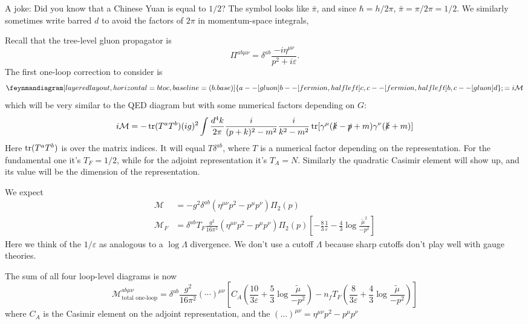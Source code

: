 A joke: Did you know that a Chinese Yuan is equal to $1/2$?
The symbol looks like $\bar \pi$, and since $\hbar = h/2 \pi$, $\bar \pi = \pi/2 \pi = 1/2$.
We similarly sometimes write barred $d$ to avoid the factors of $2 \pi$ in momentum-space integrals, 

Recall that the tree-level gluon propagator is
\[
\Pi^{ab \mu \nu} = \delta^{ab} \frac{-i \eta^{\mu \nu}}{p^2 + i \varepsilon}.
\]
The first one-loop correction to consider is 
\[
\feynmandiagram [layered layout, horizontal = b to c, baseline = (b.base)] {
  a -- [gluon] b -- [fermion, half left] c,
  c -- [fermion, half left] b,
  c -- [gluon] d  
}; = i \mathcal M
\]
which will be very similar to the QED diagram but with some numerical factors depending on $G$:
\[
 i \mathcal M = - \operatorname{tr}(T^a T^b) (i g)^2 \int \frac{d^4k}{2 \pi} \frac{i}{(p+k)^2 - m^2}\frac{i}{k^2 - m^2} \operatorname{tr}[\gamma^\mu (\slashed k - \slashed p +m) \gamma^\nu(\slashed k + m)]
\]
Here $\operatorname{tr}(T^a T^b)$ is over the matrix indices.
It will equal $T \delta^{ab}$, where $T$ is a numerical factor depending on the representation.
For the fundamental one it's $T_F = 1/2$, while for the adjoint representation it's $T_A = N$.
Similarly the quadratic Casimir element will show up, and its value will be the dimension of the representation.

We expect 
\begin{align*}
\mathcal M &= -g^2 \delta^{ab} (\eta^{\mu \nu}p^2 - p^\mu p^\nu) \Pi_2(p)\\
\mathcal M_F &= \delta^{ab} T_F \frac{g^2}{16 \pi^2} (\eta^{\mu \nu}p^2 - p^\mu p^\nu)  \Pi_2(p) \left[ -\frac{8}{3} \frac{1}{\varepsilon} - \frac{4}{3} \log \frac{\tilde \mu^2}{-p^2}\right]
\end{align*}
Here we think of the $1/\varepsilon$ as analogous to a $\log \Lambda$ divergence.
We don't use a cutoff $\Lambda$ because sharp cutoffs don't play well with gauge theories.

The sum of all four loop-level diagrams is now
\[
\mathcal{M}^{ab \mu \nu}_{\text{total one-loop}} = \delta^{ab} \frac{g^2}{16 \pi^2} ( \cdots)^{\mu \nu} \left[ C_A \left( \frac{10}{3 \varepsilon} + \frac{5}{3} \log \frac{\tilde \mu}{-p^2} \right) - n_f T_F\left( \frac{8}{3 \varepsilon} + \frac{4}{3} \log \frac{\tilde \mu}{-p^2} \right) \right]
\]
where $C_A$ is the Casimir element on the adjoint representation, and the $(\dots)^{\mu \nu} = \eta^{\mu \nu}p^2 - p^\mu p^\nu$ 


